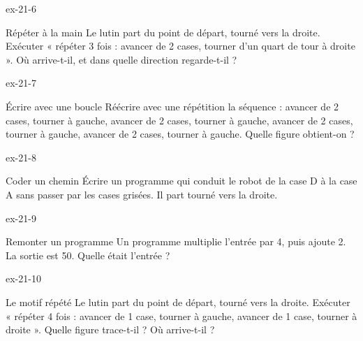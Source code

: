 \begin{blocLivre}{ex-21-6}\begin{exercice}[2]{Répéter à la main}
Le lutin part du point de départ, tourné vers la droite. Exécuter « répéter 3 fois : avancer de 2 cases, tourner d’un quart de tour à droite ». Où arrive-t-il, et dans quelle direction regarde-t-il ?
\label{fig-ex-21-6}
\end{exercice}\end{blocLivre}
\begin{blocLivre}{ex-21-7}\begin{exercice}[2]{Écrire avec une boucle}
Réécrire avec une répétition la séquence : avancer de 2 cases, tourner à gauche, avancer de 2 cases, tourner à gauche, avancer de 2 cases, tourner à gauche, avancer de 2 cases, tourner à gauche. Quelle figure obtient-on ?
\end{exercice}\end{blocLivre}
\begin{blocLivre}{ex-21-8}\begin{exercice}[2]{Coder un chemin}
Écrire un programme qui conduit le robot de la case D à la case A sans passer par les cases grisées. Il part tourné vers la droite.
\label{fig-ex-21-8}
\end{exercice}\end{blocLivre}
\begin{blocLivre}{ex-21-9}\begin{exercice}[2]{Remonter un programme}
Un programme multiplie l’entrée par 4, puis ajoute 2. La sortie est 50. Quelle était l’entrée ?
\end{exercice}\end{blocLivre}
\begin{blocLivre}{ex-21-10}\begin{exercice}[2]{Le motif répété}
Le lutin part du point de départ, tourné vers la droite. Exécuter « répéter 4 fois : avancer de 1 case, tourner à gauche, avancer de 1 case, tourner à droite ». Quelle figure trace-t-il ? Où arrive-t-il ?
\label{fig-ex-21-10}
\end{exercice}\end{blocLivre}

